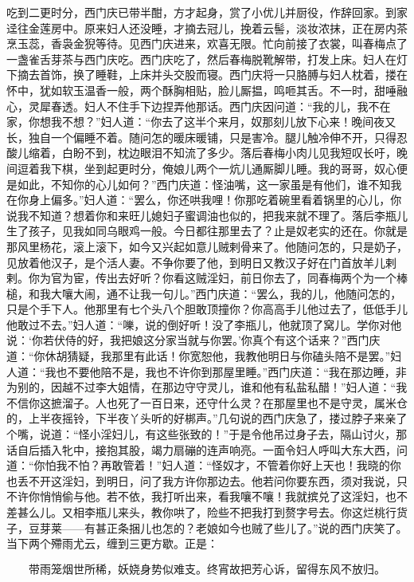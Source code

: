 吃到二更时分，西门庆已带半酣，方才起身，赏了小优儿并厨役，作辞回家。到家迳往金莲房中。原来妇人还没睡，才摘去冠儿，挽着云髻，淡妆浓抹，正在房内茶烹玉蕊，香袅金猊等待。见西门庆进来，欢喜无限。忙向前接了衣裳，叫春梅点了一盏雀舌芽茶与西门庆吃。西门庆吃了，然后春梅脱靴解带，打发上床。妇人在灯下摘去首饰，换了睡鞋，上床并头交股而寝。西门庆将一只胳膊与妇人枕着，搂在怀中，犹如软玉温香一般，两个酥胸相贴，脸儿厮揾，鸣咂其舌。不一时，甜唾融心，灵犀春透。妇人不住手下边捏弄他那话。西门庆因问道：“我的儿，我不在家，你想我不想？”妇人道：“你去了这半个来月，奴那刻儿放下心来！晚间夜又长，独自一个偏睡不着。随问怎的暖床暖铺，只是害冷。腿儿触冷伸不开，只得忍酸儿缩着，白盼不到，枕边眼泪不知流了多少。落后春梅小肉儿见我短叹长吁，晚间逗着我下棋，坐到起更时分，俺娘儿两个一炕儿通厮脚儿睡。我的哥哥，奴心便是如此，不知你的心儿如何？”西门庆道：怪油嘴，这一家虽是有他们，谁不知我在你身上偏多。”妇人道：“罢么，你还哄我哩！你那吃着碗里看着锅里的心儿，你说我不知道？想着你和来旺儿媳妇子蜜调油也似的，把我来就不理了。落后李瓶儿生了孩子，见我如同乌眼鸡一般。今日都往那里去了？止是奴老实的还在。你就是那风里杨花，滚上滚下，如今又兴起如意儿贼\textShouWai 剌骨来了。他随问怎的，只是奶子，见放着他汉子，是个活人妻。不争你要了他，到明日又教汉子好在门首放羊儿剌剌。你为官为宦，传出去好听？你看这贼淫妇，前日你去了，同春梅两个为一个棒槌，和我大嚷大闹，通不让我一句儿。”西门庆道：“罢么，我的儿，他随问怎的，只是个手下人。他那里有七个头八个胆敢顶撞你？你高高手儿他过去了，低低手儿他敢过不去。”妇人道：“嚛，说的倒好听！没了李瓶儿，他就顶了窝儿。学你对他说：‘你若伏侍的好，我把娘这分家当就与你罢。’你真个有这个话来？”西门庆道：“你休胡猜疑，我那里有此话！你宽恕他，我教他明日与你磕头陪不是罢。”妇人道：“我也不要他陪不是，我也不许你到那屋里睡。”西门庆道：“我在那边睡，非为别的，因越不过李大姐情，在那边守守灵儿，谁和他有私盐私醋！”妇人道：“我不信你这摭溜子。人也死了一百日来，还守什么灵？在那屋里也不是守灵，属米仓的，上半夜摇铃，下半夜丫头听的好梆声。”几句说的西门庆急了，搂过脖子来亲了个嘴，说道：“怪小淫妇儿，有这些张致的！”于是令他吊过身子去，隔山讨火，那话自后插入牝中，接抱其股，竭力扇磞的连声响亮。一面令妇人呼叫大东大西，问道：“你怕我不怕？再敢管着！”妇人道：“怪奴才，不管着你好上天也！我晓的你也丢不开这淫妇，到明日，问了我方许你那边去。他若问你要东西，须对我说，只不许你悄悄偷与他。若不依，我打听出来，看我嚷不嚷！我就摈兑了这淫妇，也不差甚么儿。又相李瓶儿来头，教你哄了，险些不把我打到赘字号去。你这烂桃行货子，豆芽莱——有甚正条捆儿也怎的？老娘如今也贼了些儿了。”说的西门庆笑了。当下两个殢雨尤云，缠到三更方歇。正是：

\[
带雨笼烟世所稀，妖娆身势似难支。
终宵故把芳心诉，留得东风不放归。
\]

